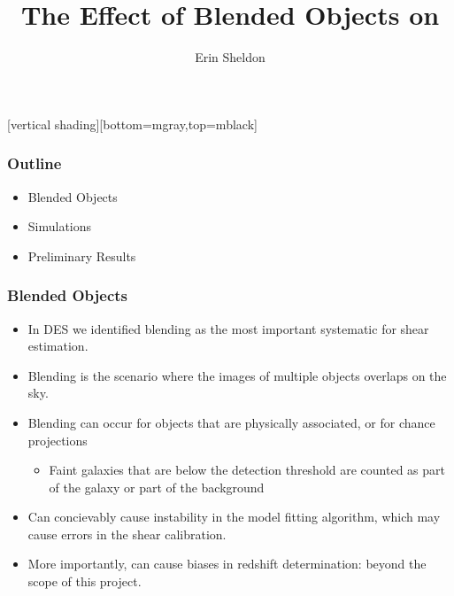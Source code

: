 \documentclass{beamer}
\title{The Effect of Blended Objects on \mcal}
\author{Erin Sheldon}
\institute{Brookhaven National Laboratory}
\begin{document}
\frame{\titlepage}


[vertical shading][bottom=mgray,top=mblack]

\frame
{
    \frametitle{Outline}

 
    \begin{itemize}

        \item Blended Objects
        \item Simulations
        \item Preliminary Results

    \end{itemize}

}

\frame
{
    \frametitle{Blended Objects}

 
    \begin{itemize}

        \item In DES we identified blending as the most important systematic
            for shear estimation.

        \item Blending is the scenario where the images of multiple objects overlaps
            on the sky.

        \item Blending can occur for objects that are physically associated, or
            for chance projections 

            \begin{itemize}
                \item Faint galaxies that are below the detection threshold are counted
                    as part of the galaxy or part of the background
            \end{itemize}

        \item Can concievably cause instability in the model fitting algorithm, which
            may cause errors in the shear calibration.

        \item More importantly, can cause biases in redshift determination:
            beyond the scope of this project. 


    \end{itemize}

}
\end{document}
